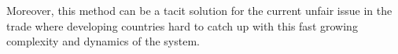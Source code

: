 Moreover, this method can be a tacit solution for the current unfair issue in the trade where developing countries 
hard to catch up with this fast growing complexity and dynamics of the system.
